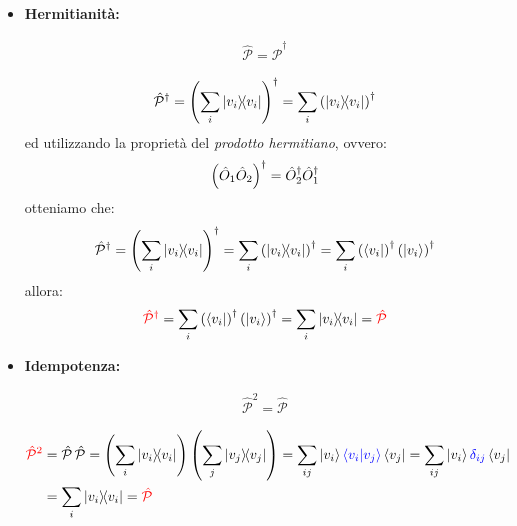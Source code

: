 \begin{itemize}
	\item \textbf{Hermitianità:}
	\begin{nb}
	\begin{align*}
		\hat{\mathcal{P}} = \hat{\mathcal{P}}^{\dagger}
	\end{align*}
	\end{nb}
	\begin{myprf}
	\begin{align*}
		\hat{\mathcal{P}}^{\dagger} = \qty(\sum_i \ketbra{v_i})^{\dagger} = \sum_i \qty(\ketbra{v_i})^{\dagger}
	\end{align*}
		ed utilizzando la proprietà del \textit{prodotto hermitiano}, ovvero:
	\begin{align*}
		\qty(\hat{O}_1 \hat{O}_2)^{\dagger} = \hat{O}_2^{\dagger}\hat{O}_1^{\dagger}
	\end{align*}
		otteniamo che:
	\begin{align*}
		\hat{\mathcal{P}}^{\dagger} = \qty(\sum_i \ketbra{v_i})^{\dagger} = \sum_i \qty(\ketbra{v_i})^{\dagger} = \sum_i \qty(\bra{v_i})^{\dagger} \, \qty(\ket{v_i})^{\dagger} 
	\end{align*}
		allora:
	\begin{align*}
		\textcolor{red}{\hat{\mathcal{P}}^{\dagger}} = \sum_i \qty(\bra{v_i})^{\dagger} \, \qty(\ket{v_i})^{\dagger} = \sum_i \ketbra{v_i} = \textcolor{red}{\hat{\mathcal{P}}}
	\end{align*}
	\end{myprf}
	
	\item \textbf{Idempotenza:} 
	\begin{nb}
	\begin{align*}
		\hat{\mathcal{P}}^2 = \hat{\mathcal{P}} 
	\end{align*}
	\end{nb}
	\begin{myprf}
	\begin{align*}
		 \textcolor{red}{\hat{\mathcal{P}}^2} &= \hat{\mathcal{P}} \, \hat{\mathcal{P}} = \qty(\sum_i \ketbra{v_i}) \, \qty(\sum_j \ketbra{v_j}) = \sum_{ij} \ket{v_i} \textcolor{blue}{\braket{v_i}{v_j}} \bra{v_j} = \sum_{ij} \ket{v_i} \textcolor{blue}{\delta_{ij}} \bra{v_j} \\
		& = \sum_{i} \ketbra{v_i} = \textcolor{red}{\hat{\mathcal{P}} }
	\end{align*}
	
	\end{myprf}
\end{itemize}

